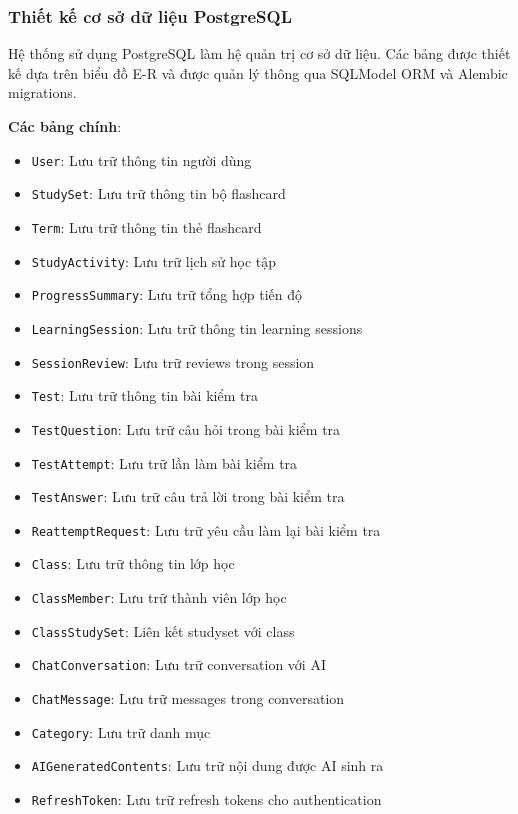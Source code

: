 \documentclass[../DoAn.tex]{subfiles}
\begin{document}
\subsubsection{Thiết kế cơ sở dữ liệu PostgreSQL}

Hệ thống sử dụng PostgreSQL làm hệ quản trị cơ sở dữ liệu. Các bảng được thiết kế dựa trên biểu đồ E-R và được quản lý thông qua SQLModel ORM và Alembic migrations.

\textbf{Các bảng chính}:

\begin{itemize}
    \item \texttt{User}: Lưu trữ thông tin người dùng
    \item \texttt{StudySet}: Lưu trữ thông tin bộ flashcard
    \item \texttt{Term}: Lưu trữ thông tin thẻ flashcard
    \item \texttt{StudyActivity}: Lưu trữ lịch sử học tập
    \item \texttt{ProgressSummary}: Lưu trữ tổng hợp tiến độ
    \item \texttt{LearningSession}: Lưu trữ thông tin learning sessions
    \item \texttt{SessionReview}: Lưu trữ reviews trong session
    \item \texttt{Test}: Lưu trữ thông tin bài kiểm tra
    \item \texttt{TestQuestion}: Lưu trữ câu hỏi trong bài kiểm tra
    \item \texttt{TestAttempt}: Lưu trữ lần làm bài kiểm tra
    \item \texttt{TestAnswer}: Lưu trữ câu trả lời trong bài kiểm tra
    \item \texttt{ReattemptRequest}: Lưu trữ yêu cầu làm lại bài kiểm tra
    \item \texttt{Class}: Lưu trữ thông tin lớp học
    \item \texttt{ClassMember}: Lưu trữ thành viên lớp học
    \item \texttt{ClassStudySet}: Liên kết studyset với class
    \item \texttt{ChatConversation}: Lưu trữ conversation với AI
    \item \texttt{ChatMessage}: Lưu trữ messages trong conversation
    \item \texttt{Category}: Lưu trữ danh mục
    \item \texttt{AIGeneratedContents}: Lưu trữ nội dung được AI sinh ra
    \item \texttt{RefreshToken}: Lưu trữ refresh tokens cho authentication
\end{itemize}
\end{document}
